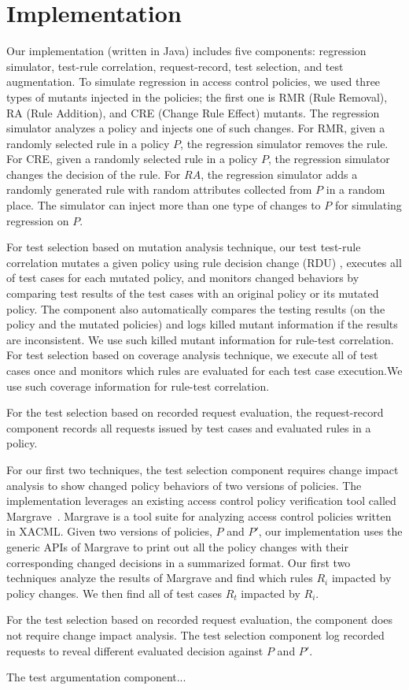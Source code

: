\section{Implementation} \label{sec:implementation}

Our implementation (written in Java) includes five components: regression simulator, test-rule correlation, request-record, test selection,
and test augmentation. To simulate regression in access control policies, 
we used three types of mutants injected in the policies; the first one
is RMR (Rule Removal), RA (Rule Addition), and CRE (Change Rule Effect)
mutants. The regression simulator analyzes a policy and injects one
of such changes. For RMR, given a randomly selected rule in a policy $P$,
the regression simulator removes the rule. For CRE,
given a randomly selected rule in a policy $P$, the regression simulator changes
the decision of the rule.
For $RA$, the regression simulator adds a randomly generated
rule with random attributes collected from $P$ in a random place.
The simulator can inject more than one type of changes to $P$ for simulating
regression on $P$.

For test selection based on mutation analysis technique,
our test test-rule correlation mutates a given policy using rule decision change (RDU)
, executes all of test cases for each mutated policy, and monitors changed
behaviors by comparing test results of the test cases with an original policy or its mutated policy.
The component also automatically compares the testing results (on the policy and the mutated
policies) and logs killed mutant information if the results are inconsistent. We use
such killed mutant information for rule-test correlation.
For test selection based on coverage analysis technique,
we execute  all of test cases once and monitors
which rules are evaluated for each test case execution.We use such
coverage information for rule-test correlation.

For the test selection based on recorded request evaluation,
the request-record component records all requests issued by test cases and evaluated rules in a policy.

For our first two techniques, the test selection component requires change impact analysis to
show changed policy behaviors of two versions of policies.
The implementation leverages an existing access control policy verification tool called Margrave~\cite{fisler05:verification}. Margrave is a tool suite for analyzing access control policies written in XACML.
Given two versions of policies, $P$ and $P'$, 
our implementation uses the generic APIs of Margrave to
print out all the policy changes with their corresponding changed decisions in a summarized format.
Our first two techniques analyze the results of Margrave and
find which rules $R_i$ impacted by policy changes. We then find all of test cases $R_t$
impacted by $R_i$.

For the test selection based on recorded request evaluation,
the component does not require change impact analysis. The test selection
component log recorded requests to reveal different evaluated decision against $P$ and $P'$.

The test argumentation component...



